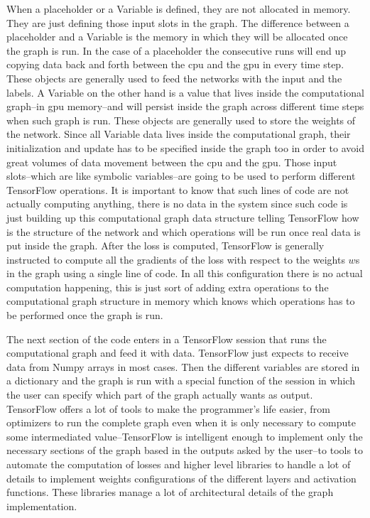 \documentclass[11pt,a4paper]{article}
\begin{document}
When a placeholder or a Variable is defined, they are not allocated in memory. They are just defining those input slots in the graph. The difference between a placeholder and a Variable is the memory in which they will be allocated once the graph is run. In the case of a placeholder the consecutive runs will end up copying data back and forth between the \gls{cpu} and the \gls{gpu} in every time step. These objects are generally used to feed the networks with the input and the labels. A Variable on the other hand is a value that lives inside the computational graph--in \gls{gpu} memory--and will persist inside the graph across different time steps when such graph is run. These objects are generally used to store the weights of the network. Since all Variable data lives inside the computational graph, their initialization and update has to be specified inside the graph too in order to avoid great volumes of data movement between the \gls{cpu} and the \gls{gpu}. Those input slots--which are like symbolic variables--are going to be used to perform different TensorFlow operations. It is important to know that such lines of code are not actually computing anything, there is no data in the system since such code is just building up this computational graph data structure telling TensorFlow how is the structure of the network and which operations will be run once real data is put inside the graph. After the loss is computed, TensorFlow is generally instructed to compute all the gradients of the loss with respect to the weights $w$s in the graph using a single line of code. In all this configuration there is no actual computation happening, this is just sort of adding extra operations to the computational graph structure in memory which knows which operations has to be performed once the graph is run.

The next section of the code enters in a TensorFlow session that runs the computational graph and feed it with data. TensorFlow just expects to receive data from Numpy arrays in most cases. Then the different variables are stored in a dictionary and the graph is run with a special function of the session in which the user can specify which part of the graph actually wants as output. TensorFlow offers a lot of tools to make the programmer's life easier, from optimizers to run the complete graph even when it is only necessary to compute some intermediated value--TensorFlow is intelligent enough to implement only the necessary sections of the graph based in the outputs asked by the user--to tools to automate the computation of losses and higher level libraries to handle a lot of details to implement weights configurations of the different layers and activation functions. These libraries manage a lot of architectural details of the graph implementation.
\end{document}
